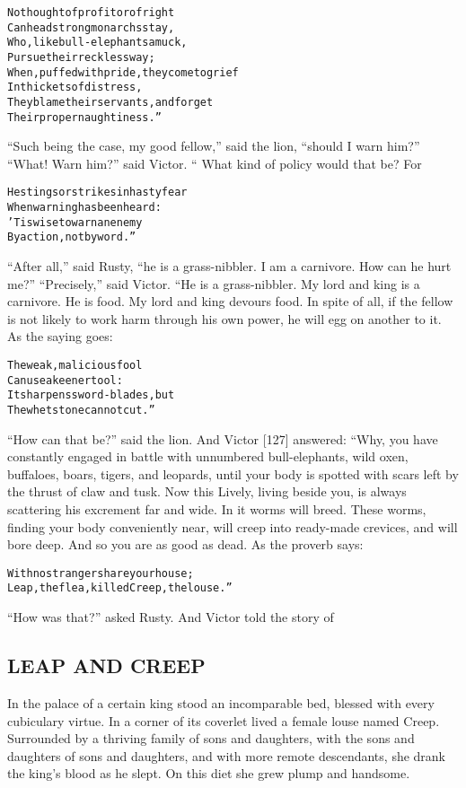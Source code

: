 \documentclass{article}
\renewenvironment{verbatim}{\begin{alltt}\normalfont\begin{centering}}{\end{centering}\end{alltt}}
\begin{document}
\begin{verbatim}
No thought of profit or of right
    Can headstrong monarchs stay,
Who, like bull-elephants amuck,
    Pursue their reckless way;
When, puffed with pride, they come to grief
    In thickets of distress,
They blame their servants, and forget
    Their proper naughtiness.”
\end{verbatim}
``Such being the case, my good fellow,'' said the lion,
``should I warn him?'' ``What! Warn him?'' said Victor. “ What kind
of policy would that be? For

\begin{verbatim}
He stings or strikes in hasty fear
    When warning has been heard:
'Tis wise to warn an enemy
    By action, not by word.”
\end{verbatim}
``After all,'' said Rusty,
``he is a grass-nibbler. I am a carnivore. How can he hurt me?''
``Precisely,'' said Victor. “He is a grass-nibbler. My lord and
king is a carnivore. He is food. My lord and king devours food. In
spite of all, if the fellow is not likely to work harm through his
own power, he will egg on another to it. As the saying goes:

\begin{verbatim}
The weak, malicious fool
Can use a keener tool:
It sharpens sword-blades, but
The whetstone cannot cut.”
\end{verbatim}
``How can that be?'' said the lion. And Victor [127] answered:
“Why, you have constantly engaged in battle with unnumbered
bull-elephants, wild oxen, buffaloes, boars, tigers, and leopards,
until your body is spotted with scars left by the thrust of claw
and tusk. Now this Lively, living beside you, is always scattering
his excrement far and wide. In it worms will breed. These worms,
finding your body conveniently near, will creep into ready-made
crevices, and will bore deep. And so you are as good as dead. As
the proverb says:

\begin{verbatim}
With no stranger share your house;
Leap, the flea, killed Creep, the louse.”
\end{verbatim}
``How was that?'' asked Rusty. And Victor told the story of

\subsection{LEAP AND CREEP}

In the palace of a certain king stood an incomparable bed, blessed
with every cubiculary virtue. In a corner of its coverlet lived a
female louse named Creep. Surrounded by a thriving family of sons
and daughters, with the sons and daughters of sons and daughters,
and with more remote descendants, she drank the king's blood as he
slept. On this diet she grew plump and handsome.
\end{document}
